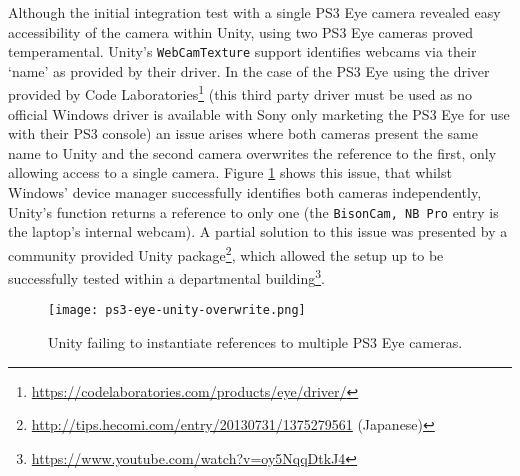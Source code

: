 Although the initial integration test with a single PS3 Eye camera revealed easy accessibility of the camera within Unity, using two PS3 Eye cameras proved temperamental. Unity's \texttt{WebCamTexture} support identifies webcams via their `name' as provided by their driver. In the case of the PS3 Eye using the driver provided by Code Laboratories\footnote{\url{https://codelaboratories.com/products/eye/driver/}} (this third party driver must be used as no official Windows driver is available with Sony only marketing the PS3 Eye for use with their PS3 console) an issue arises where both cameras present the same name to Unity and the second camera overwrites the reference to the first, only allowing access to a single camera. Figure \ref{ps3-eye-unity-overwrite.png} shows this issue, that whilst Windows' device manager successfully identifies both cameras independently, Unity's  function returns a reference to only one (the \texttt{BisonCam, NB Pro} entry is the laptop's internal webcam). A partial solution to this issue was presented by a community provided Unity package\footnote{\url{http://tips.hecomi.com/entry/20130731/1375279561} (Japanese)}, which allowed the setup up to be successfully tested within a departmental building\footnote{\url{https://www.youtube.com/watch?v=oy5NqqDtkJ4}}.

\begin{figure}[h]
	\begin{center}
		\texttt{[image: ps3-eye-unity-overwrite.png]}
		\caption{Unity failing to instantiate references to multiple PS3 Eye cameras.}
		\label{ps3-eye-unity-overwrite.png}
	\end{center}
\end{figure}

